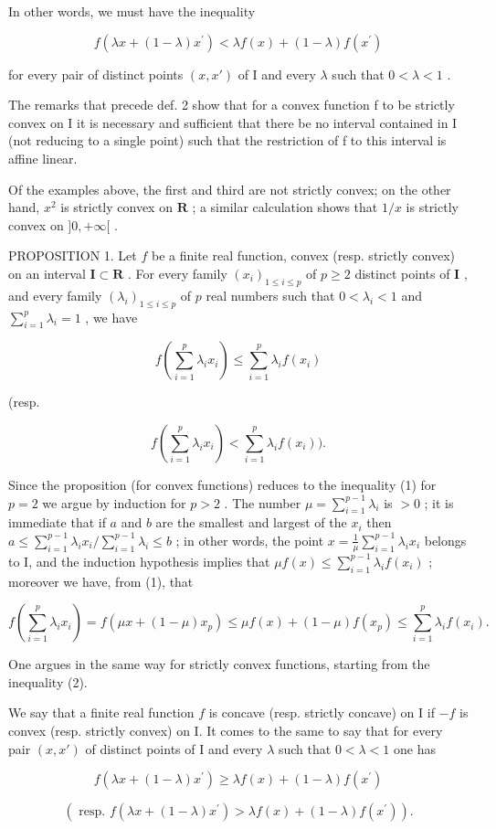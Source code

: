 In other words, we must have the inequality

\[
f (\lambda x + (1 - \lambda) x ^ {\prime}) <   \lambda f (x) + (1 - \lambda) f (x ^ {\prime})\tag{2}
\]

for every pair of distinct points \((x, x')\) of I and every \(\lambda\) such that \(0 < \lambda < 1\) .

The remarks that precede def. 2 show that for a convex function f to be strictly convex on I it is necessary and sufficient that there be no interval contained in I (not reducing to a single point) such that the restriction of f to this interval is affine linear.

Of the examples above, the first and third are not strictly convex; on the other hand, \(x^2\) is strictly convex on \(\mathbf{R}\) ; a similar calculation shows that \(1 / x\) is strictly convex on \(]0, +\infty[\) .

PROPOSITION 1. Let \(f\) be a finite real function, convex (resp. strictly convex) on an interval \(\mathbf{I} \subset \mathbf{R}\) . For every family \((x_i)_{1 \leqslant i \leqslant p}\) of \(p \geqslant 2\) distinct points of \(\mathbf{I}\) , and every family \((\lambda_i)_{1 \leqslant i \leqslant p}\) of \(p\) real numbers such that \(0 < \lambda_i < 1\) and \(\sum_{i=1}^{p} \lambda_i = 1\) , we have

\[
f \left(\sum_ {i = 1} ^ {p} \lambda_ {i} x _ {i}\right) \leqslant \sum_ {i = 1} ^ {p} \lambda_ {i} f (x _ {i})\tag{3}
\]

(resp.

\[
f \left(\sum_ {i = 1} ^ {p} \lambda_ {i} x _ {i}\right) <   \sum_ {i = 1} ^ {p} \lambda_ {i} f (x _ {i})).\tag{4}
\]

Since the proposition (for convex functions) reduces to the inequality (1) for \(p = 2\) we argue by induction for \(p > 2\) . The number \(\mu = \sum_{i=1}^{p-1} \lambda_i\) is \(> 0\) ; it is immediate that if \(a\) and \(b\) are the smallest and largest of the \(x_i\) then \(a \leqslant \sum_{i=1}^{p-1} \lambda_i x_i / \sum_{i=1}^{p-1} \lambda_i \leqslant b\) ; in other words, the point \(x = \frac{1}{\mu} \sum_{i=1}^{p-1} \lambda_i x_i\) belongs to I, and the induction hypothesis implies that \(\mu f(x) \leqslant \sum_{i=1}^{p-1} \lambda_i f(x_i)\) ; moreover we have, from (1), that

\[
f \left(\sum_ {i = 1} ^ {p} \lambda_ {i} x _ {i}\right) = f (\mu x + (1 - \mu) x _ {p}) \leqslant \mu f (x) + (1 - \mu) f (x _ {p}) \leqslant \sum_ {i = 1} ^ {p} \lambda_ {i} f (x _ {i}).
\]

One argues in the same way for strictly convex functions, starting from the inequality (2).

We say that a finite real function \(f\) is concave (resp. strictly concave) on I if \(-f\) is convex (resp. strictly convex) on I. It comes to the same to say that for every pair \((x, x')\) of distinct points of I and every \(\lambda\) such that \(0 < \lambda < 1\) one has

\[
f (\lambda x + (1 - \lambda) x ^ {\prime}) \geqslant \lambda f (x) + (1 - \lambda) f (x ^ {\prime})
\]

\[
(\text { resp. } f (\lambda x + (1 - \lambda) x ^ {\prime}) > \lambda f (x) + (1 - \lambda) f (x ^ {\prime})).
\]

